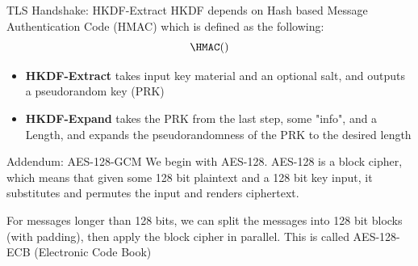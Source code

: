 \documentclass{beamer}
\begin{document}
\begin{frame}{TLS Handshake: HKDF-Extract}
    HKDF depends on Hash based Message Authentication Code (HMAC) which is defined as the following:
    \[
        \HMAC()
    \]
    \begin{itemize}
        \item \textbf{HKDF-Extract} takes input key material and an optional salt, and outputs a pseudorandom key (PRK)
        \item \textbf{HKDF-Expand} takes the PRK from the last step, some "info", and a Length, and expands the pseudorandomness of the PRK to the desired length 
    \end{itemize}
\end{frame}

\begin{frame}{Addendum: AES-128-GCM}
    We begin with AES-128. AES-128 is a block cipher, which means that given some 128 bit plaintext and a 128 bit key input, it substitutes and permutes the input and renders ciphertext.

    For messages longer than 128 bits, we can split the messages into 128 bit blocks (with padding), then apply the block cipher in parallel. This is called AES-128-ECB (Electronic Code Book)
\end{frame}
\end{document}
